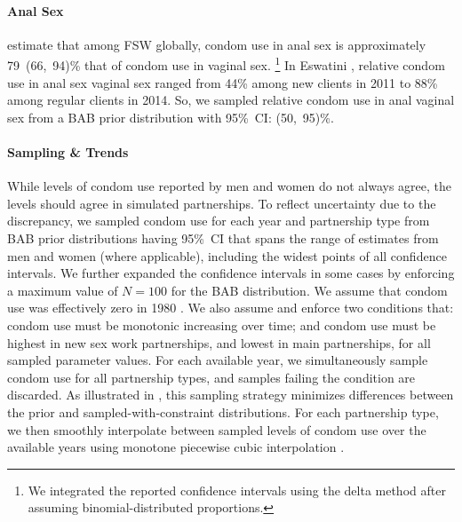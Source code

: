 \paragraph{Anal Sex}
\citet{Owen2020sr} estimate that among FSW globally,
condom use in anal sex is approximately 79~(66,~94)\% that of condom use in vaginal sex.%
\footnote{We integrated the reported confidence intervals using the delta method
  after assuming binomial-distributed proportions.}
In Eswatini \cite{Baral2014,EswKP2014}, relative condom use in anal sex \vs vaginal sex
ranged from 44\% among new clients in 2011 to 88\% among regular clients in 2014.
So, we sampled relative condom use in anal \vs vaginal sex from a BAB prior distribution
with 95\%~CI: (50,~95)\%.
\paragraph{Sampling \& Trends}
While levels of condom use reported by men and women do not always agree,
the levels should agree in simulated partnerships.
To reflect uncertainty due to the discrepancy,
we sampled condom use for each year and partnership type
from BAB prior distributions having 95\%~CI
that spans the range of estimates from men and women (where applicable),
including the widest points of all confidence intervals.
We further expanded the confidence intervals in some cases
by enforcing a maximum value of $N = 100$ for the BAB distribution.
We assume that condom use was effectively zero in 1980 \cite{SFHS1988}.
We also assume and enforce two conditions that:
condom use must be monotonic increasing over time; and
condom use must be highest in new sex work partnerships, and lowest in main partnerships,
for all sampled parameter values.
For each available year, we simultaneously sample condom use for all partnership types,
and samples failing the condition are discarded.
As illustrated in , this sampling strategy
minimizes differences between the prior and sampled-with-constraint distributions.
For each partnership type, we then smoothly interpolate
between sampled levels of condom use over the available years
using monotone piecewise cubic interpolation \cite{Fritsch1980}.
